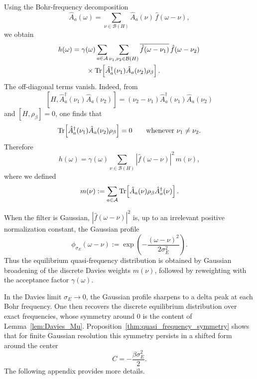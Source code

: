 \documentclass[showpacs,amsmath,amssymb,twocolumn,prx,superscriptaddress,10pt,aps,nofootinbib]{revtex4-2}
\begin{document}
Using the Bohr-frequency decomposition
\begin{equation}
    \hat A_a(\omega)=\sum_{\nu\in\mathcal B(H)}\hat A_a(\nu)\,\hat f(\omega-\nu),
\end{equation}
we obtain
\begin{equation}
\begin{split}
    h(\omega)
    &=
    \gamma(\omega)
    \sum_{a\in\mathcal A}
    \sum_{\nu_1,\nu_2\in\mathcal B(H)}
    \overline{\hat f(\omega-\nu_1)}\,\hat f(\omega-\nu_2)\, 
    \\
    &\qquad \times \Tr\!\left[\hat A_a^\dagger(\nu_1)\hat A_a(\nu_2)\rho_\beta\right].
\end{split}
\end{equation}
The off-diagonal terms vanish. Indeed, from
\[
[H,\hat A_a^\dagger(\nu_1)\hat A_a(\nu_2)]
=
(\nu_2-\nu_1)\hat A_a^\dagger(\nu_1)\hat A_a(\nu_2)
\]
and \([H,\rho_\beta]=0\), one finds that
\[
\Tr\!\left[\hat A_a^\dagger(\nu_1)\hat A_a(\nu_2)\rho_\beta\right]=0
\qquad
\text{whenever }\nu_1\neq \nu_2.
\]
Therefore
\begin{equation}
\label{eq:app_h_diagonal_form}
    h(\omega)
    =
    \gamma(\omega)\sum_{\nu\in\mathcal B(H)}
    |\hat f(\omega-\nu)|^2\,m(\nu),
\end{equation}
where we defined
\begin{equation}
\label{eq:app_m_nu_definition}
    m(\nu):=
    \sum_{a\in\mathcal A}
    \Tr\!\left[\hat A_a(\nu)\rho_\beta \hat A_a^\dagger(\nu)\right].
\end{equation}

When the filter is Gaussian, \(|\hat f(\omega-\nu)|^2\) is, up to an irrelevant positive normalization constant, the Gaussian profile
\begin{equation}
\label{eq:app_phi_sigmaE}
    \phi_{\sigma_E}(\omega-\nu):=
    \exp\!\left(-\frac{(\omega-\nu)^2}{2\sigma_E^2}\right).
\end{equation}
Thus the equilibrium quasi-frequency distribution is obtained by Gaussian broadening of the discrete Davies weights \(m(\nu)\), followed by reweighting with the acceptance factor \(\gamma(\omega)\).

In the Davies limit \(\sigma_E\to0\), the Gaussian profile sharpens to a delta peak at each Bohr frequency. One then recovers the discrete equilibrium distribution over exact frequencies, whose symmetry around \(0\) is the content of Lemma~\ref{lem:Davies_Mu}. Proposition~\ref{thm:quasi_frequency_symmetry} shows that for finite Gaussian resolution this symmetry persists in a shifted form around the center
\begin{equation}
    C=-\frac{\beta\sigma_E^2}{2}.
\end{equation}
The following appendix provides more details.
\end{document}
